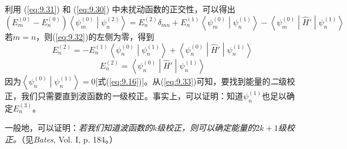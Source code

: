     利用 (\ref{eq:9.31}) 和 (\ref{eq:9.30}) 中未扰动函数的正交性，可以得出
    \begin{equation}
        \left(E_m^{\left(0\right)} - E_n^{\left(0\right)}\right)\left\langle \psi_m^{\left(0\right)} \middle| \psi_n^{\left(2\right)} \right\rangle = E_n^{\left(2\right)} \delta_{mn} + E_n^{\left(1\right)} \left\langle \psi_m^{\left(0\right)} \middle| \psi_n^{\left(1\right)} \right\rangle - \left\langle \psi_m^{\left(0\right)} \middle| \hat{H}' \middle| \psi_n^{\left(1\right)} \right\rangle
        \label{eq:9.32}
    \end{equation}
    若$m=n$，则(\ref{eq:9.32})的左侧为零，得到
    \begin{equation*}
        E_n^{\left(2\right)} = - E_n^{\left(1\right)} \left\langle \psi_n^{\left(0\right)} \middle| \psi_n^{\left(1\right)} \right\rangle + \left\langle \psi_n^{\left(0\right)} \middle| \hat{H}' \middle| \psi_n^{\left(1\right)} \right\rangle 
    \end{equation*}
    \begin{equation}
        E_n^{\left(2\right)} = \left\langle \psi_n^{\left(0\right)} \middle| \hat{H}' \middle| \psi_n^{\left(1\right)} \right\rangle
        \label{eq:9.33}
    \end{equation}
    因为$\left\langle \psi_n^{\left(0\right)} \middle| \psi_n^{\left(1\right)} \right\rangle = 0$[式(\ref{eq:9.16})]。从(\ref{eq:9.33})可知，要找到能量的\textit{二}级校正，我们只需要直到波函数的\textit{一}级校正。事实上，可以证明：知道$\psi_n^{\left(1\right)}$也足以确定$E_n^{\left(3\right)}$。

    一般地，可以证明：\textit{若我们知道波函数的$k$级校正，则可以确定能量的$2k+1$级校正。}（见\textit{Bates}, Vol. I, p. 184。）


